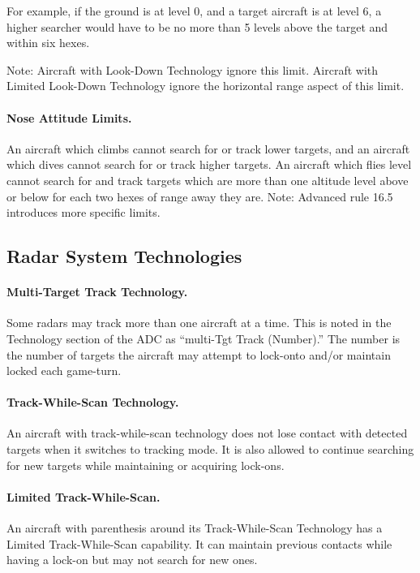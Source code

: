 For example, if the ground is at level 0, and a target aircraft is at level 6, a higher searcher would have to be no more than 5 levels above the target and within six hexes.

Note: Aircraft with Look-Down Technology ignore this limit. Aircraft with Limited Look-Down Technology ignore the horizontal range aspect of this limit.

\paragraph{Nose Attitude Limits.} An aircraft which climbs cannot search for or track lower targets, and an aircraft which dives cannot search for or track higher targets. An aircraft which flies level cannot search for and track targets which are more than one altitude level above or below for each two hexes of range away they are. Note: Advanced rule 16.5 introduces more specific limits.

\advancedrules

\subsection{Radar System Technologies}

\paragraph{Multi-Target Track Technology.} Some radars may track more than one aircraft at a time. This is noted in the Technology section of the ADC as “multi-Tgt Track (Number).” The number is the number of targets the aircraft may attempt to lock-onto and/or maintain locked each game-turn.

\paragraph{Track-While-Scan Technology.} An aircraft with track-while-scan technology does not lose contact with detected targets when it switches to tracking mode. It is also allowed to continue searching for new targets while maintaining or acquiring lock-ons.

\paragraph{Limited Track-While-Scan.} An aircraft with parenthesis around its Track-While-Scan Technology has a Limited Track-While-Scan capability. It can maintain previous contacts while having a lock-on but may not search for new ones.

